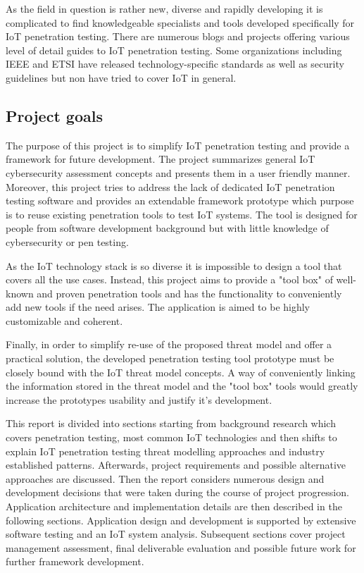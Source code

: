 As the field in question is rather new, diverse and rapidly developing it is complicated to find knowledgeable specialists and tools developed specifically for IoT penetration testing. There are numerous blogs and projects offering various level of detail guides to IoT penetration testing\cite{github}. Some organizations including IEEE and ETSI have released technology-specific standards as well as security guidelines but non have tried to cover IoT in general\cite{Zhao:2013:SIT:2584913.2585964}. 

\subsection{Project goals}
The purpose of this project is to simplify IoT penetration testing and provide a framework for future development. The project summarizes general IoT cybersecurity assessment concepts and presents them in a user friendly manner. Moreover, this project tries to address the lack of dedicated IoT penetration testing software and provides an extendable framework prototype which purpose is to reuse existing penetration tools to test IoT systems. The tool is designed for people from software development background but with little knowledge of cybersecurity or pen testing. 

As the IoT technology stack is so diverse it is impossible to design a tool that covers all the use cases. Instead, this project aims to provide a "tool box" of well-known and proven penetration tools and has the functionality to conveniently add new tools if the need arises. The application is aimed to be highly customizable and coherent.

Finally, in order to simplify re-use of the proposed threat model and offer a practical solution, the developed penetration testing tool prototype must be closely bound with the IoT threat model concepts. A way of conveniently linking the information stored in the threat model and the "tool box" tools would greatly increase the prototypes usability and justify it's development.

This report is divided into sections starting from background research which covers penetration testing, most common IoT technologies and then shifts to explain IoT penetration testing threat modelling approaches and industry established patterns. Afterwards, project requirements and possible alternative approaches are discussed. Then the report considers numerous design and development decisions that were taken during the course of project progression. Application architecture and implementation details are then described in the following sections. Application design and development is supported by extensive software testing and an IoT system analysis. Subsequent sections cover project management assessment, final deliverable evaluation and possible future work for further framework development.

